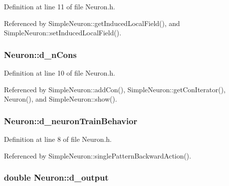 Definition at line 11 of file Neuron.h.



Referenced by SimpleNeuron::getInducedLocalField(), and SimpleNeuron::setInducedLocalField().

\hypertarget{class_neuron_ac3cb61c8582bb07bb3c61fe9fa07489b}{
\subsubsection[{d\_\-nCons}]{ {\bf Neuron::d\_\-nCons}}}
\label{class_neuron_ac3cb61c8582bb07bb3c61fe9fa07489b}


Definition at line 10 of file Neuron.h.



Referenced by SimpleNeuron::addCon(), SimpleNeuron::getConIterator(), Neuron(), and SimpleNeuron::show().

\hypertarget{class_neuron_ab435b271c3deef356620b5582630e77b}{
\subsubsection[{d\_\-neuronTrainBehavior}]{ {\bf Neuron::d\_\-neuronTrainBehavior}}}
\label{class_neuron_ab435b271c3deef356620b5582630e77b}


Definition at line 8 of file Neuron.h.



Referenced by SimpleNeuron::singlePatternBackwardAction().

\hypertarget{class_neuron_a1e0b130755580b323da98c5332a6610e}{
\subsubsection[{d\_\-output}]{\setlength{\rightskip}{0pt plus 5cm}double {\bf Neuron::d\_\-output}}}
\label{class_neuron_a1e0b130755580b323da98c5332a6610e}


